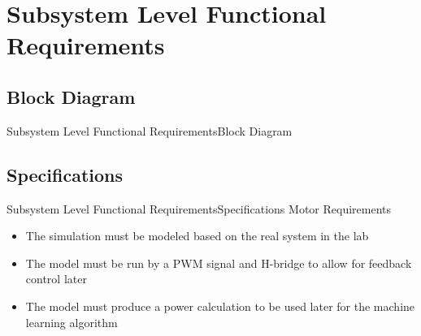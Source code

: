 \documentclass{beamer}
\begin{document}

\section{Subsystem Level Functional Requirements}



\subsection{Block Diagram}

\begin{frame}{Subsystem Level Functional Requirements}{Block Diagram}
\begin{figure}
      \label{fig:Motor Block Diagram}
\end{figure}

\end{frame}




\subsection{Specifications}

\begin{frame}{Subsystem Level Functional Requirements}{Specifications}
Motor Requirements
\begin{itemize}
    \item The simulation must be modeled based on the real system in the lab
    \item The model must be run by a PWM signal and H-bridge to allow for feedback control later
    \item The model must produce a power calculation to be used later for the machine learning algorithm
\end{itemize}
\end{frame}
\end{document}
